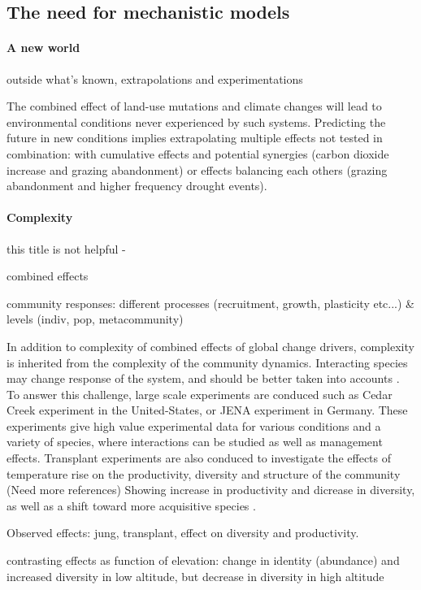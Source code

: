 \subsection{The need for mechanistic models}

\paragraph{A new world}
outside what's known, extrapolations and experimentations

The combined effect of land-use mutations and climate changes will lead to environmental conditions never experienced by such systems. Predicting the future in new conditions implies extrapolating multiple effects not tested in combination: with cumulative effects and potential synergies (carbon dioxide increase and grazing abandonment) or effects balancing each others (grazing abandonment and higher frequency drought events).


 \paragraph{Complexity}
 this title is not helpful -
 
 combined effects
 
 community responses: different processes (recruitment, growth, plasticity etc...) \& levels (indiv, pop, metacommunity)
 

 In addition to complexity of combined effects of global change drivers, complexity is inherited from the complexity of the community dynamics. Interacting species may change response of the system, and should be better taken into accounts \parencite{gilman_framework_2010}. To answer this challenge, large scale experiments are conduced such as Cedar Creek experiment in the United-States, or JENA experiment in Germany. These experiments give high value experimental data for various conditions and a variety of species, where interactions can be studied as well as management effects.
 Transplant experiments are also conduced to investigate the effects of temperature rise on the productivity, diversity and structure of the community \cite{scheepens_genotypic_2010}(Need more references) Showing increase in productivity and dicrease in diversity, as well as a shift toward more acquisitive species \parencite{debouk_functional_2015}.
 
 Observed effects: jung, transplant, effect on diversity and productivity.
 
contrasting effects as function of elevation: change in identity (abundance) and increased diversity in low altitude, but decrease in diversity in high altitude \parencite{rosbakh_elevation_2014}
 
